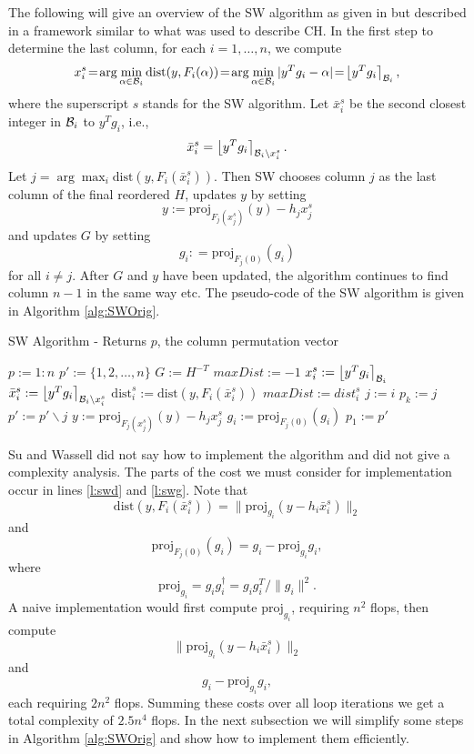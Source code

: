 \documentclass[12pt,Bold,letterpaper]{mcgilletdclass}
\newcommand{\be}{\begin{equation}}
\newcommand{\ee}{\end{equation}}
\newcommand{\dist}{\mathrm{dist}}
\begin{document}
The following will give an overview of the SW algorithm as given in
\cite{SuW05} but described in a framework similar to what was used to describe
CH. In the first step to determine the last column, for each $i = 1, \dots, n$,
we compute 
\be
x_i^s \!=\! \arg\min_{\alpha\in {\cal B}_i}\dist(y,F_i(\alpha)) 
\!=\!  \arg\min _{\alpha\in {\cal B}_i}| y^Tg_i - \alpha | \!=\! \left \lfloor y^Tg_i \right \rceil_{{\cal B}_i},
\label{eq:xis}
\ee
where the superscript $s$  stands for the SW algorithm.
Let $\bar{x}_i^s$ be the second closest integer in ${{\cal B}_i }$ to $y^Tg_i$, i.e.,
$$\bar{x}_i^s = \left \lfloor y^Tg_i \right \rceil_{{\cal B}_i\backslash x_i^s}.$$
Let $j = \arg\max_i  \dist (y,F_i(\bar{x}_i^s))$. 
Then SW chooses column $j$ as the last column of the final reordered $H$,
updates $y$ by setting 
$$y:=\mbox{proj}_{F_j(x_j^s)}(y) -h_jx_j^s$$  and 
updates $G$ by setting $$g_i: = \mbox{proj}_{F_j(0)}(g_i)$$ for all $i\neq j$. 
After $G$ and $y$ have been updated, the algorithm continues to find column $n-1$ in the
same way etc. The pseudo-code of the SW algorithm is given in Algorithm \ref{alg:SWOrig}.
\begin{algorithm}
\caption{SW Algorithm - Returns $p$, the column permutation vector}
\label{alg:SWOrig}
\begin{algorithmic}[1]
\STATE $p := 1:n$
\STATE $p' := \{1, 2, \ldots, n\}$
\STATE \label{l:swG} $G := H^{-T}$ \hfill %
	\STATE $maxDist := -1$
		\STATE $x_i^s := \left \lfloor  y^Tg_i \right \rceil_{{\cal B }_i}$ \hfill%
		     \label{l:swx}
		\STATE $\bar{x}_i^s := \left \lfloor y^Tg_i \right \rceil_{{{\cal B }_i}{\backslash x_i^s}}$
		    \label{l:swbx}
		\STATE  \label{l:swd} $\dist_i^s := \dist(y,F_i(\bar{x}_i^s))$ %
			\STATE $maxDist := dist_i^s$
			\STATE $j := i$
		\ENDIF
	\ENDFOR
	\STATE $p_k := j$
	\STATE $p' := p' \backslash j$
	\STATE $y := \mbox{proj}_{F_j(x_j^s)}(y) -h_jx_j^s$  \label{l:swy}
		\STATE \label{l:swg} $g_i := \mbox{proj}_{F_j(0)}(g_i) $ %
	\ENDFOR
\ENDFOR
\STATE $p_1 := p'$
\end{algorithmic}
\end{algorithm}

Su and Wassell did not say how to implement the algorithm and did not give a complexity analysis.
The parts of the cost we must consider for implementation occur in
lines \ref{l:swd} and \ref{l:swg}.
Note that $$\dist(y,F_i(\bar{x}_i^s))=\|\mbox{proj}_{g_i}(y-h_i\bar{x}_i^s)\|_2$$
and $$\mbox{proj}_{F_j(0)}(g_i)= g_i -\mbox{proj}_{g_i} g_i,$$
where $$\mbox{proj}_{g_i}=g_ig_i^\dag = g_ig_i^T/\|g_i\|^2.$$ 
A naive implementation would first compute $\mbox{proj}_{g_i}$, requiring $n^2$ flops, then compute 
$$\|\mbox{proj}_{g_i}(y-h_i\bar{x}_i^s)\|_2$$ and $$g_i -\mbox{proj}_{g_i} g_i,$$ each requiring $2n^2$ flops.
Summing these costs over all loop iterations we get a total complexity of $2.5n^4$ flops.
In the next subsection we will simplify some steps in Algorithm \ref{alg:SWOrig}
and show how to  implement them efficiently.
\end{document}
